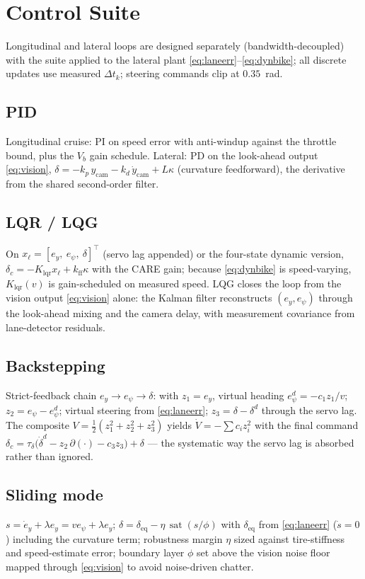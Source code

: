 \documentclass[conference]{IEEEtran}
\newcommand{\sat}{\operatorname{sat}}
\begin{document}
\section{Control Suite}
Longitudinal and lateral loops are designed separately (bandwidth-decoupled) with the suite applied to the lateral plant \eqref{eq:laneerr}--\eqref{eq:dynbike}; all discrete updates use measured $\Delta t_k$; steering commands clip at $0.35$~rad.

\subsection{PID}
Longitudinal cruise: PI on speed error with anti-windup against the throttle bound, plus the $V_b$ gain schedule. Lateral: PD on the look-ahead output \eqref{eq:vision},
$\delta = -k_p\,y_{\mathrm{cam}} - k_d\,\dot y_{\mathrm{cam}} + L\kappa$ (curvature feedforward), the derivative from the shared second-order filter.

\subsection{LQR / LQG}
On $x_\ell = [e_y,\ e_\psi,\ \delta]^{\!\top}$ (servo lag appended) or the four-state dynamic version, $\delta_c = -K_{\mathrm{lqr}}x_\ell + k_{\mathrm{ff}}\kappa$ with the CARE gain; because \eqref{eq:dynbike} is speed-varying, $K_{\mathrm{lqr}}(v)$ is gain-scheduled on measured speed. LQG closes the loop from the vision output \eqref{eq:vision} alone: the Kalman filter reconstructs $(e_y, e_\psi)$ through the look-ahead mixing and the camera delay, with measurement covariance from lane-detector residuals.

\subsection{Backstepping}
Strict-feedback chain $e_y \to e_\psi \to \delta$: with $z_1 = e_y$, virtual heading $e_\psi^d = -c_1 z_1/v$; $z_2 = e_\psi - e_\psi^d$; virtual steering from \eqref{eq:laneerr}; $z_3 = \delta - \delta^d$ through the servo lag. The composite $V = \tfrac12(z_1^2 + z_2^2 + z_3^2)$ yields $\dot V = -\sum c_i z_i^2$ with the final command $\delta_c = \tau_\delta\bigl(\dot\delta^d - z_2\,\partial(\cdot) - c_3 z_3\bigr) + \delta$ --- the systematic way the servo lag is absorbed rather than ignored.

\subsection{Sliding mode}
$s = \dot e_y + \lambda e_y = v e_\psi + \lambda e_y$;
$\delta = \delta_{\mathrm{eq}} - \eta\,\sat(s/\phi)$ with $\delta_{\mathrm{eq}}$ from \eqref{eq:laneerr} ($\dot s = 0$) including the curvature term; robustness margin $\eta$ sized against tire-stiffness and speed-estimate error; boundary layer $\phi$ set above the vision noise floor mapped through \eqref{eq:vision} to avoid noise-driven chatter.
\end{document}
